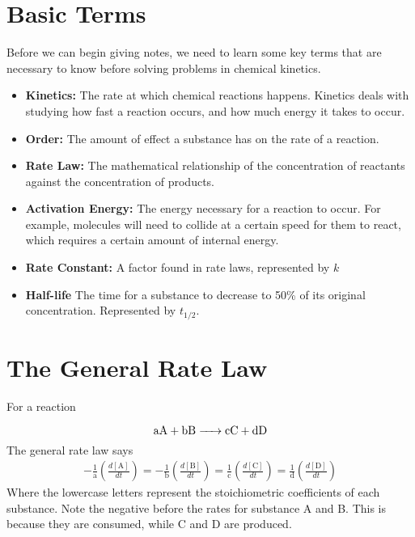 \documentclass[11pt]{article}
\begin{document}
\section{Basic Terms}  Before we can begin giving notes, we need to learn some key terms that are necessary to know before solving problems in chemical kinetics.
\begin{itemize}
    \item \textbf{Kinetics:} The rate at which chemical reactions happens. Kinetics deals with studying how fast a reaction occurs, and how much energy it takes to occur.
    \item \textbf{Order:} The amount of effect a substance has on the rate of a reaction.
    \item \textbf{Rate Law:} The mathematical relationship of the concentration of reactants against the concentration of products.
    \item \textbf{Activation Energy:} The energy necessary for a reaction to occur. For example, molecules will need to collide at a certain 
    speed for them to react, which requires a certain amount of internal energy.
    \item \textbf{Rate Constant:} A factor found in rate laws, represented by $k$
    \item \textbf{Half-life} The time for a substance to decrease to 50\% of its original concentration. Represented by $t_{1/2}$.
\end{itemize}
\section{The General Rate Law} For a reaction 

$$\ce{aA + bB -> cC + dD}$$
The general rate law says 
\begin{align}
    -\frac{1}{\text{a}}\left(\frac{d[\text{A}]}{dt}\right) = -\frac{1}{\text{b}}\left(\frac{d[\text{B}]}{dt}\right) = \frac{1}{\text{c}}\left(\frac{d[\text{C}]}{dt}\right) = \frac{1}{\text{d}}\left(\frac{d[\text{D}]}{dt}\right)
\end{align}
Where the lowercase letters represent the stoichiometric coefficients of each substance. Note the negative before the rates for substance A and B. This is because they are consumed, while C and D are produced.



    
\end{document}
